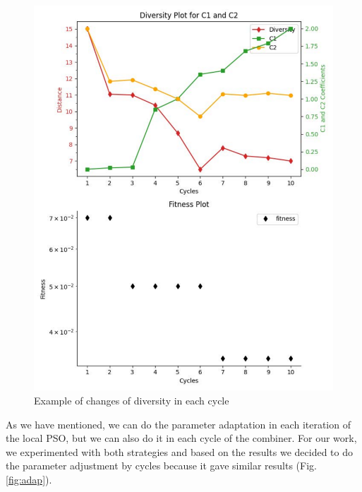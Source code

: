 \documentclass[runningheads]{llncs}
\begin{document}
\begin{figure} [htbp]
  \centering
  \includegraphics[angle=0,width=1\textwidth]{myplot.pdf}
  \caption{Example of changes of diversity in each cycle}
  \label{fig:ejemplo} 
\end{figure}

As we have mentioned, we can do the parameter adaptation in each iteration of the local PSO, but we can also do it in each cycle of the combiner. For our work, we experimented with both strategies and based on the results we decided to do the parameter adjustment by cycles because it gave similar results (Fig. \ref{fig:adap}).
\end{document}
